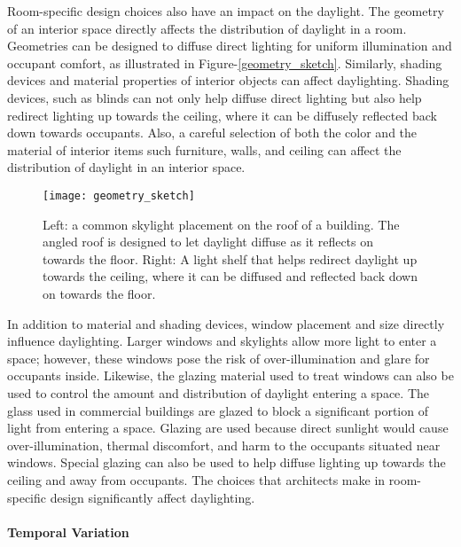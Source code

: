     Room-specific design choices also have an impact on the daylight.
    The geometry of an interior space directly affects the distribution of daylight in a room.
    Geometries can be designed to diffuse direct lighting for uniform illumination and occupant comfort, as illustrated in Figure-\ref{geometry_sketch}.
    Similarly, shading devices and material properties of interior objects can affect daylighting.
    Shading devices, such as blinds can not only help diffuse direct lighting but also help redirect lighting up towards the ceiling, where it can be diffusely reflected back down towards occupants.
    Also, a careful selection of both the color and the material of interior items such furniture, walls, and ceiling can affect the distribution of daylight in an interior space. 

    \begin{figure}[h]
      \centering
      \texttt{[image: geometry\_sketch]}
      \caption{Left: a common skylight placement on the roof of a building. The angled roof is designed to let daylight diffuse as it reflects on towards the floor. Right: A light shelf that helps redirect daylight up towards the ceiling, where it can be diffused and reflected back down on towards the floor.}
      \label{fig:geometry_sketch}
    \end{figure}

    In addition to material and shading devices, window placement and size directly influence daylighting.
    Larger windows and skylights allow more light to enter a space; however, these windows pose the risk of over-illumination and glare for occupants inside.
    Likewise, the glazing material used to treat windows can also be used to control the amount and distribution of daylight entering a space.
    The glass used in commercial buildings are glazed to block a significant portion of light from entering a space.
    Glazing are used because direct sunlight would cause over-illumination, thermal discomfort, and harm to the occupants situated near windows.
    Special glazing can also be used to help diffuse lighting up towards the ceiling and away from occupants.
    The choices that architects make in room-specific design significantly affect daylighting.\\

    \paragraph{Temporal Variation} 

